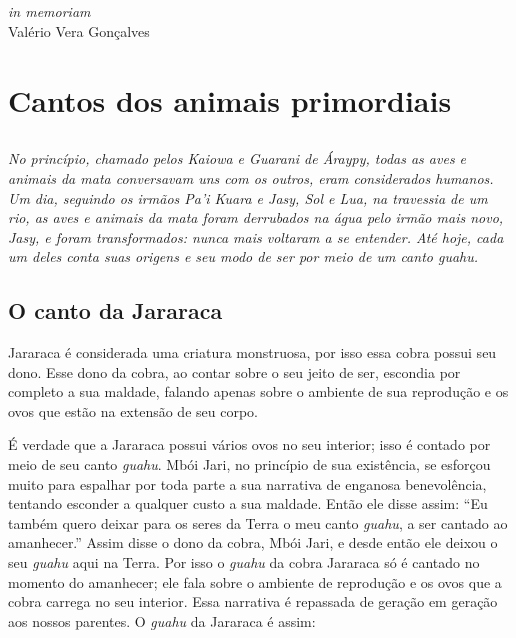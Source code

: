 \chapter*{}
\thispagestyle{empty}

\vfill
\begin{flushright}
\small
\textit{in memoriam}\\
Valério Vera Gonçalves
\end{flushright}

\part{Cantos dos animais primordiais}%

\chapter*{}
\thispagestyle{empty}
\vspace*{\fill}
\textit{No princípio, chamado pelos Kaiowa e Guarani de \emph{Áraypy}, todas as
aves e animais da mata conversavam uns com os outros, eram considerados
humanos. Um dia, seguindo os irmãos Pa'i Kuara e Jasy, Sol e Lua, na
travessia de um rio, as aves e animais da mata foram derrubados na água
pelo irmão mais novo, Jasy, e foram transformados: nunca mais voltaram a
se entender. Até hoje, cada um deles conta suas origens e seu modo de
ser por meio de um canto \emph{guahu}.}
\vspace*{\fill}

\chapter{O canto da Jararaca}

 Jararaca é considerada uma criatura monstruosa, por isso essa cobra
possui seu dono. Esse dono da cobra, ao contar sobre o seu jeito de ser,
escondia por completo a sua maldade, falando apenas sobre o ambiente de
sua reprodução e os ovos que estão na extensão de seu corpo.

É verdade que a Jararaca possui vários ovos no seu interior; isso é
contado por meio de seu canto \textit{guahu}. Mbói Jari, no princípio de
sua existência, se esforçou muito para espalhar por toda parte a sua
narrativa de enganosa benevolência, tentando esconder a qualquer custo a
sua maldade. Então ele disse assim: ``Eu também quero deixar para os
seres da Terra o meu canto \textit{guahu}, a ser cantado ao amanhecer.''
Assim disse o dono da cobra, Mbói Jari, e desde então ele deixou o seu
\textit{guahu} aqui na Terra. Por isso o \textit{guahu} da cobra Jararaca só
é cantado no momento do amanhecer; ele fala sobre o ambiente de
reprodução e os ovos que a cobra carrega no seu interior. Essa narrativa
é repassada de geração em geração aos nossos parentes. O \textit{guahu} da
Jararaca é assim:

